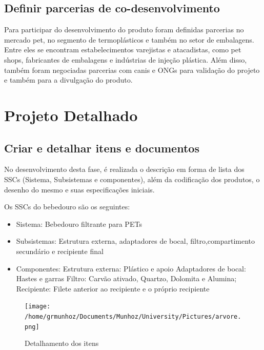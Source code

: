 \documentclass[
	12pt,				%
	openright,			%
	oneside,			%
	a4paper,			%
	english,			%
	french,				%
	spanish,			%
	brazil				%
	]{abntex2}
\begin{document}
\section{Definir parcerias de co-desenvolvimento}

Para participar do desenvolvimento do produto foram definidas parcerias no mercado pet, no segmento de termoplásticos e também no setor de embalagens. Entre eles se encontram estabelecimentos varejistas e atacadistas, como pet shops, fabricantes de embalagens e indústrias de injeção plástica. Além disso, também foram negociadas parcerias com canis e ONGs para validação do projeto e também para a divulgação do produto.


\newpage
\chapter{Projeto Detalhado}

\section{Criar e detalhar itens e documentos}

No desenvolvimento desta fase, é realizada o descrição em forma de lista dos SSCs (Sistema, Subsistemas e componentes), além da codificação dos produtos, o desenho do mesmo e suas especificações iniciais.

Os SSCs do bebedouro são os seguintes:

\begin{itemize}
\item Sistema: Bebedouro filtrante para PETs
\item Subsistemas: Estrutura externa, adaptadores de bocal, filtro,compartimento secundário e recipiente final
\item Componentes: 
\subitem Estrutura externa: Plástico e apoio
\subitem Adaptadores de bocal: Hastes e garras
\subitem Filtro: Carvão ativado,  Quartzo, Dolomita e Alumina;
\subitem Recipiente: Filete anterior ao recipiente e o próprio recipiente
\end{itemize}

\begin{figure}[H]
\begin{center}
\caption{Detalhamento dos itens}
\texttt{[image: /home/grmunhoz/Documents/Munhoz/University/Pictures/arvore.png]} 
\label{figetapas}
\end{center}
\end{figure}
\end{document}
